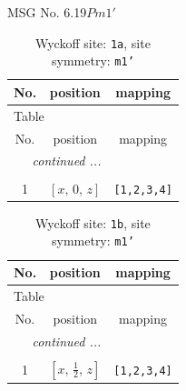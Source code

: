 \documentclass[fleqn,8pt]{jsarticle}
\begin{document}
\setcounter{MaxMatrixCols}{32}

\renewcommand{\tablename}{Table~}
\renewcommand{\figurename}{Figure~}
\begin{center}
\LARGE
MSG No. 6.19\quad$Pm1'$
\end{center}
\renewcommand{\arraystretch}{1.2}
\begin{longtable}{ccc}
\caption{Wyckoff site: {\tt 1a}, site symmetry: {\tt m1'}}
 \\
 \hline \hline
No. & position & mapping \\ \hline \endfirsthead

\multicolumn{2}{l}{\tablename\ \thetable{}} \\
 \hline \hline
No. & position & mapping \\ \hline \endhead

 \hline \hline
\multicolumn{2}{r}{\footnotesize\it continued ...} \\ \endfoot

 \hline \hline
\multicolumn{2}{r}{} \\ \endlastfoot

1 & $\left[ x,\, 0,\, z \right]$ & {\tt [1,2,3,4]} \\
\end{longtable}
\renewcommand{\arraystretch}{1.2}
\begin{longtable}{ccc}
\caption{Wyckoff site: {\tt 1b}, site symmetry: {\tt m1'}}
 \\
 \hline \hline
No. & position & mapping \\ \hline \endfirsthead

\multicolumn{2}{l}{\tablename\ \thetable{}} \\
 \hline \hline
No. & position & mapping \\ \hline \endhead

 \hline \hline
\multicolumn{2}{r}{\footnotesize\it continued ...} \\ \endfoot

 \hline \hline
\multicolumn{2}{r}{} \\ \endlastfoot

1 & $\left[ x,\, \frac{1}{2},\, z \right]$ & {\tt [1,2,3,4]} \\
\end{longtable}
\renewcommand{\arraystretch}{1.2}
\end{document}
